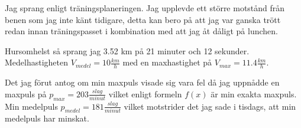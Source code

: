 \documentclass[a4paper, 12pt]{article}
\begin{document}
    Jag sprang enligt träningsplaneringen. Jag upplevde ett större motstånd från benen som jag inte känt tidigare, detta kan bero på att jag var ganska trött redan innan träningspasset i kombination med att jag åt dåligt på lunchen. 

    Hursomhelst så sprang jag 3.52 km på 21 minuter och 12 sekunder. Medelhastigheten $V_{medel} = 10\frac{km}{h}$ med en maxhastighet på $V_{max} = 11.4\frac{km}{h}$. 
    
    Det jag förut antog om min maxpuls visade sig vara fel då jag uppnådde en maxpuls på $p_{max} = 203\frac{slag}{minut}$ vilket enligt formeln $f(x)$ är min exakta maxpuls. Min medelpuls $p_{medel} = 181\frac{slag}{minut}$ vilket motstrider det jag sade i tisdags, att min medelpuls har minskat. 
\end{document}
